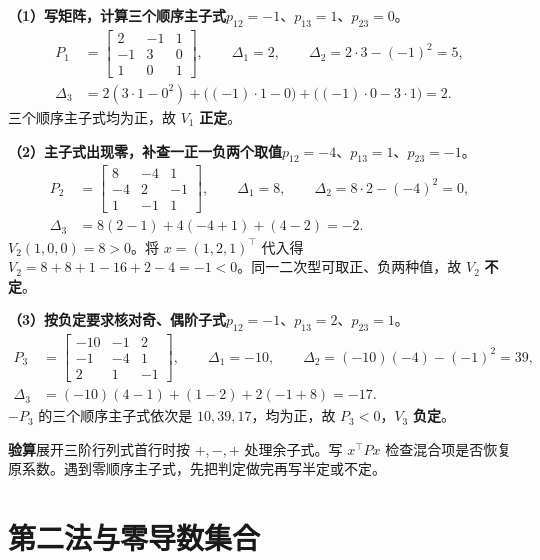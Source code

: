 \documentclass[UTF8,a4paper,11pt,fontset=fandol]{ctexart}
\begin{document}
\textbf{（1）写矩阵，计算三个顺序主子式}\quad $p_{12}=-1$、$p_{13}=1$、$p_{23}=0$。
\[
\begin{aligned}
  P_1&=\begin{bmatrix}2&-1&1\\-1&3&0\\1&0&1\end{bmatrix},\qquad
  \Delta_1=2,\qquad \Delta_2=2\cdot3-(-1)^2=5,\\
  \Delta_3&=2(3\cdot1-0^2)+\bigl((-1)\cdot1-0\bigr)
                  +\bigl((-1)\cdot0-3\cdot1\bigr)=2.
\end{aligned}
\]
三个顺序主子式均为正，故 $V_1$ \textbf{正定}。

\textbf{（2）主子式出现零，补查一正一负两个取值}\quad $p_{12}=-4$、$p_{13}=1$、$p_{23}=-1$。
\[
\begin{aligned}
  P_2&=\begin{bmatrix}8&-4&1\\-4&2&-1\\1&-1&1\end{bmatrix},\qquad
  \Delta_1=8,\qquad \Delta_2=8\cdot2-(-4)^2=0,\\
  \Delta_3&=8(2-1)+4(-4+1)+(4-2)=-2.
\end{aligned}
\]
$V_2(1,0,0)=8>0$。将 $x=(1,2,1)^\top$ 代入得
$V_2=8+8+1-16+2-4=-1<0$。同一二次型可取正、负两种值，故 $V_2$ \textbf{不定}。

\textbf{（3）按负定要求核对奇、偶阶子式}\quad $p_{12}=-1$、$p_{13}=2$、$p_{23}=1$。
\[
\begin{aligned}
  P_3&=\begin{bmatrix}-10&-1&2\\-1&-4&1\\2&1&-1\end{bmatrix},\qquad
  \Delta_1=-10,\qquad \Delta_2=(-10)(-4)-(-1)^2=39,\\
  \Delta_3&=(-10)(4-1)+(1-2)+2(-1+8)=-17.
\end{aligned}
\]
$-P_3$ 的三个顺序主子式依次是 $10,39,17$，均为正，故 $P_3<0$，$V_3$ \textbf{负定}。

\begin{keybox}
\textbf{验算}\quad 展开三阶行列式首行时按 $+,-,+$ 处理余子式。写 $x^\top Px$ 检查混合项是否恢复原系数。遇到零顺序主子式，先把判定做完再写半定或不定。
\end{keybox}

\newpage
\section{第二法与零导数集合}\label{sec:direct}
\end{document}
